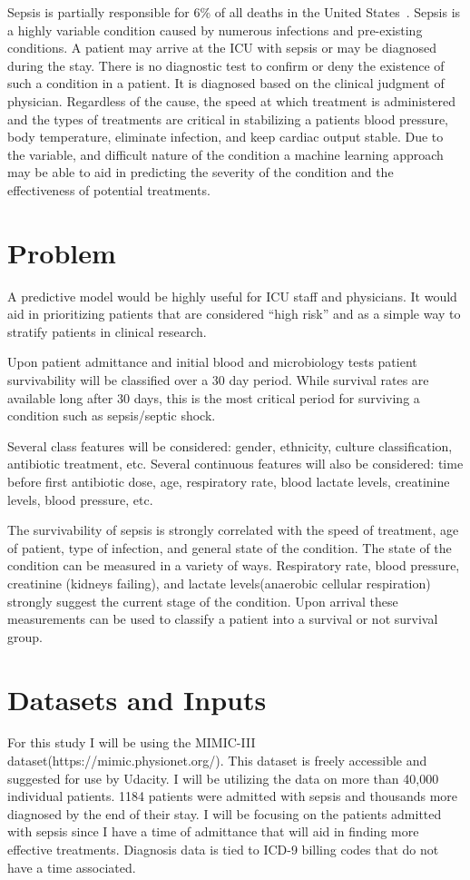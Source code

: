 \documentclass[11pt]{article}
\begin{document}
Sepsis is partially responsible for 6\% of all deaths in the United States~\cite{cdc}. Sepsis is a highly variable condition caused by numerous infections and pre-existing conditions. A patient may arrive at the ICU with sepsis or may be diagnosed during the stay. There is no diagnostic test to confirm or deny the existence of such a condition in a patient. It is diagnosed based on the clinical judgment of physician. Regardless of the cause, the speed at which treatment is administered and the types of treatments are critical in stabilizing a patients blood pressure, body temperature, eliminate infection, and keep cardiac output stable. Due to the variable, and difficult nature of the condition a machine learning approach may be able to aid in predicting the severity of the condition and the effectiveness of potential treatments.


\section{Problem}

A predictive model would be highly useful for ICU staff and physicians. It would aid in prioritizing patients that are considered ``high risk'' and as a simple way to stratify patients in clinical research. 

Upon patient admittance and initial blood and microbiology tests patient survivability will be classified over a 30 day period. While survival rates are available long after 30 days, this is the most critical period for surviving a condition such as sepsis/septic shock. 

Several class features will be considered: gender, ethnicity, culture classification, antibiotic treatment, etc. Several continuous features will also be considered: time before first antibiotic dose, age, respiratory rate, blood lactate levels, creatinine levels, blood pressure, etc.

The survivability of sepsis is strongly correlated with the speed of treatment, age of patient, type of infection, and general state of the condition. The state of the condition can be measured in a variety of ways. Respiratory rate, blood pressure, creatinine (kidneys failing), and lactate levels(anaerobic cellular respiration) strongly suggest the current stage of the condition. Upon arrival these measurements can be used to classify a patient into a survival or not survival group.

\section{Datasets and Inputs}
For this study I will be using the MIMIC-III dataset(https://mimic.physionet.org/). This dataset is freely accessible and suggested for use by Udacity. I will be utilizing the data on more than 40,000 individual patients. 1184 patients were admitted with sepsis and thousands more diagnosed by the end of their stay. I will be focusing on the patients admitted with sepsis since I have a time of admittance that will aid in finding more effective treatments. Diagnosis data is tied to ICD-9 billing codes that do not have a time associated.
\end{document}
